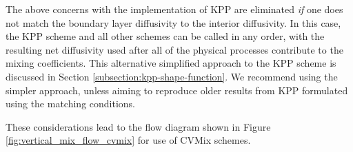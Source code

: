 The above concerns with the \cite{LargeKPP} implementation of KPP are
eliminated {\it if} one does not match the boundary layer diffusivity
to the interior diffusivity.  In this case, the KPP scheme and all
other schemes can be called in any order, with the resulting net
diffusivity used after all of the physical processes contribute to the
mixing coefficients.  This alternative simplified approach to the KPP
scheme is discussed in Section \ref{subsection:kpp-shape-function}.
We recommend using the simpler approach, unless aiming to reproduce
older results from KPP formulated using the \cite{LargeKPP} matching
conditions.

These considerations lead to the flow diagram shown in Figure
\ref{fig:vertical_mix_flow_cvmix} for use of CVMix schemes.

